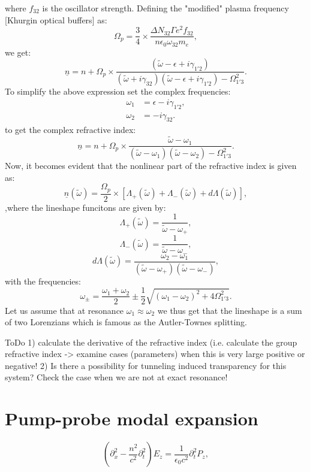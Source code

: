 \documentclass[10pt,letterpaper]{article}
\def\uline{\underline}
\begin{document}
	where $f_{32}$ is the oscillator strength. Defining the "modified" plasma frequency [Khurgin optical buffers] as: 
	$$
	\Omega_p = \frac{3}{4}\times \frac{\Delta N_{32}\Gamma e^2f_{32}}{n\epsilon_0\omega_{32}m_e}, 
	$$
	we get:
	$$
	\uline{n} = n+ \Omega_p \times \frac{(\tilde{\omega}-\epsilon+i\gamma_{1'2})}{(\tilde{\omega}+i\gamma_{32})(\tilde{\omega}-\epsilon+i\gamma_{1'2})-\Omega_{1'3}^2}.
	$$ 
	To simplify the above expression set the complex frequencies:
	\begin{align}
	\omega_1 &=\epsilon-i\gamma_{1'2}, \\
	\omega_2 &=-i\gamma_{32}.
	\end{align}
	to get the complex refractive index: 
	$$
	\uline{n} = n+ \Omega_p \times \frac{\tilde{\omega}-\omega_1}{ (\tilde{\omega}-\omega_1)(\tilde\omega-\omega_2)-\Omega_{1'3}^2}.
	$$ 	
	Now, it becomes evident that the nonlinear part of the refractive index is given as:
	$$
	\uline{n}(\tilde\omega) =  \frac{\Omega_p}{2} \times \left[ \Lambda_+(\tilde\omega) + \Lambda_- ( \tilde \omega ) +d\Lambda(\tilde{\omega})\right],
	$$ 	
	,where the lineshape funcitons are given by:
	$$
	\Lambda_+(\tilde\omega)  = \frac{1}{\tilde \omega -\omega_+},
	$$ 	
	$$
	\Lambda_-(\tilde\omega)  = \frac{1}{\tilde \omega -\omega_-},
	$$ 	
	$$
	d\Lambda(\tilde\omega)  = \frac{\omega_2-\omega_1}{  (\tilde \omega -\omega_+)(\tilde \omega -\omega_-)},
	$$ 	
	with the frequencies: 
	$$
	\omega_\pm = \frac{\omega_1+\omega_2}{2}\pm\frac{1}{2}\sqrt{(\omega_1-\omega_2)^2+4\Omega_{1'3}^2}.
	$$
	Let us assume that at resonance $\omega_1 \approx \omega_2$ we thus get that the lineshape is a sum of two Lorenzians which is famous as the Autler-Townes splitting. 
	
	ToDo
	1) calculate the derivative of the refractive index (i.e. calculate the group refractive index -> examine cases (parameters) when this is very large positive or negative! 
	2) Is there a possibility for tunneling induced transparency for this system?  Check the case when we are not at exact resonance!
	 
	\section{Pump-probe modal expansion}
	\begin{equation}
	(\partial^2_{x} -\frac{n^2}{c^2}\partial^2_t) E_z = \frac{1}{\epsilon_0 c^2}\partial^2_t P_z, 
	\label{eq:fullwave}
	\end{equation}
	 
\end{document}
